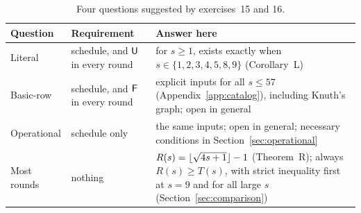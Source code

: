 \begin{table}[ht]
\centering\small
\begin{tabular}{>{\raggedright\arraybackslash}p{}
  >{\raggedright\arraybackslash}p{}
  >{\raggedright\arraybackslash}p{}}
\toprule
Question & Requirement & Answer here\\
\midrule
Literal & schedule, and $\mathsf U$ in every round & for $s\ge1$, exists
  exactly when $s\in\{1,2,3,4,5,8,9\}$ (Corollary~L)\\[3pt]
Basic-row & schedule, and $\mathsf F$ in every round & explicit inputs for all
  $s\le57$ (Appendix~\ref{app:catalog}), including Knuth's graph; open in
  general\\[3pt]
Operational & schedule only & the same inputs; open in general; necessary
  conditions in Section~\ref{sec:operational}\\[3pt]
Most rounds & nothing & $R(s)=\lfloor\sqrt{4s+1}\rfloor-1$ (Theorem~R);
  always $R(s)\ge T(s)$, with strict inequality first at $s=9$ and for
  all large $s$ (Section~\ref{sec:comparison})\\
\bottomrule
\end{tabular}
\caption{Four questions suggested by exercises~15 and 16.}
\label{tab:readings}
\end{table}
